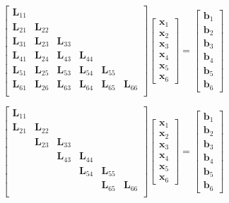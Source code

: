 \documentclass[aspectratio=169]{beamer}
\begin{document}
\begin{frame}
  \vfill
  \[
  \begin{bmatrix}
    \bm{L}_{11} &  &   &   &   &   \\
    \bm{L}_{21} & \bm{L}_{22} &   &   &   &   \\
    \bm{L}_{31} & \bm{L}_{23} & \bm{L}_{33} &   &   &   \\
    \bm{L}_{41} & \bm{L}_{24} & \bm{L}_{43} & \bm{L}_{44} &   &   \\
    \bm{L}_{51} & \bm{L}_{25} & \bm{L}_{53} & \bm{L}_{54} & \bm{L}_{55} &   \\
    \bm{L}_{61} & \bm{L}_{26} & \bm{L}_{63} & \bm{L}_{64} & \bm{L}_{65} & \bm{L}_{66} \\
  \end{bmatrix}
  \begin{bmatrix}
    \bm{x}_1 \\ \bm{x}_2 \\ \bm{x}_3 \\ \bm{x}_4 \\ \bm{x}_5 \\ \bm{x}_6
  \end{bmatrix}
  =
  \begin{bmatrix}
    \bm{b}_1 \\ \bm{b}_2 \\ \bm{b}_3 \\ \bm{b}_4 \\ \bm{b}_5 \\ \bm{b}_6
  \end{bmatrix}
  \]
  \vfill
\end{frame}

\begin{frame}
  \vfill
  \[
  \begin{bmatrix}
    \bm{L}_{11} &  &   &   &   &   \\
    \bm{L}_{21} & \bm{L}_{22} &   &   &   &   \\
     & \bm{L}_{23} & \bm{L}_{33} &   &   &   \\
     &  & \bm{L}_{43} & \bm{L}_{44} &   &   \\
     &  &  & \bm{L}_{54} & \bm{L}_{55} &   \\
     &  &  &  & \bm{L}_{65} & \bm{L}_{66} \\
  \end{bmatrix}
  \begin{bmatrix}
    \bm{x}_1 \\ \bm{x}_2 \\ \bm{x}_3 \\ \bm{x}_4 \\ \bm{x}_5 \\ \bm{x}_6
  \end{bmatrix}
  =
  \begin{bmatrix}
    \bm{b}_1 \\ \bm{b}_2 \\ \bm{b}_3 \\ \bm{b}_4 \\ \bm{b}_5 \\ \bm{b}_6
  \end{bmatrix}
  \]
  \vfill
\end{frame}
\end{document}
